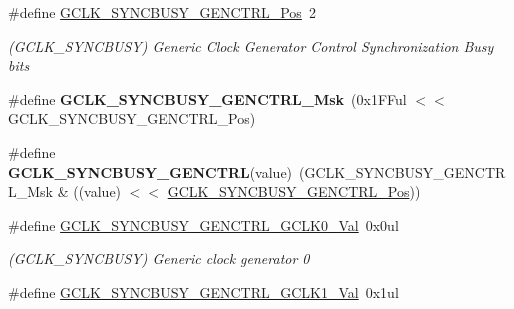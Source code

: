 \begin{DoxyCompactItemize}
\item 
\hypertarget{group___s_a_m_l21___g_c_l_k_gaccbba8857cd7d67c4c0b526841298790}{}\#define \hyperlink{group___s_a_m_l21___g_c_l_k_gaccbba8857cd7d67c4c0b526841298790}{G\+C\+L\+K\+\_\+\+S\+Y\+N\+C\+B\+U\+S\+Y\+\_\+\+G\+E\+N\+C\+T\+R\+L\+\_\+\+Pos}~2\label{group___s_a_m_l21___g_c_l_k_gaccbba8857cd7d67c4c0b526841298790}

\begin{DoxyCompactList}\small\item\em (G\+C\+L\+K\+\_\+\+S\+Y\+N\+C\+B\+U\+S\+Y) Generic Clock Generator Control Synchronization Busy bits \end{DoxyCompactList}\item 
\hypertarget{group___s_a_m_l21___g_c_l_k_ga3edcc08ad3307ebaebc71c1b793f3b9e}{}\#define {\bfseries G\+C\+L\+K\+\_\+\+S\+Y\+N\+C\+B\+U\+S\+Y\+\_\+\+G\+E\+N\+C\+T\+R\+L\+\_\+\+Msk}~(0x1\+F\+Ful $<$$<$ G\+C\+L\+K\+\_\+\+S\+Y\+N\+C\+B\+U\+S\+Y\+\_\+\+G\+E\+N\+C\+T\+R\+L\+\_\+\+Pos)\label{group___s_a_m_l21___g_c_l_k_ga3edcc08ad3307ebaebc71c1b793f3b9e}

\item 
\hypertarget{group___s_a_m_l21___g_c_l_k_ga95e77068058bd263d98538b3caf33721}{}\#define {\bfseries G\+C\+L\+K\+\_\+\+S\+Y\+N\+C\+B\+U\+S\+Y\+\_\+\+G\+E\+N\+C\+T\+R\+L}(value)~(G\+C\+L\+K\+\_\+\+S\+Y\+N\+C\+B\+U\+S\+Y\+\_\+\+G\+E\+N\+C\+T\+R\+L\+\_\+\+Msk \& ((value) $<$$<$ \hyperlink{group___s_a_m_l21___g_c_l_k_gaccbba8857cd7d67c4c0b526841298790}{G\+C\+L\+K\+\_\+\+S\+Y\+N\+C\+B\+U\+S\+Y\+\_\+\+G\+E\+N\+C\+T\+R\+L\+\_\+\+Pos}))\label{group___s_a_m_l21___g_c_l_k_ga95e77068058bd263d98538b3caf33721}

\item 
\hypertarget{group___s_a_m_l21___g_c_l_k_ga062df74b14636eb428b8f0472abb27cb}{}\#define \hyperlink{group___s_a_m_l21___g_c_l_k_ga062df74b14636eb428b8f0472abb27cb}{G\+C\+L\+K\+\_\+\+S\+Y\+N\+C\+B\+U\+S\+Y\+\_\+\+G\+E\+N\+C\+T\+R\+L\+\_\+\+G\+C\+L\+K0\+\_\+\+Val}~0x0ul\label{group___s_a_m_l21___g_c_l_k_ga062df74b14636eb428b8f0472abb27cb}

\begin{DoxyCompactList}\small\item\em (G\+C\+L\+K\+\_\+\+S\+Y\+N\+C\+B\+U\+S\+Y) Generic clock generator 0 \end{DoxyCompactList}\item 
\hypertarget{group___s_a_m_l21___g_c_l_k_ga9207e5b7583059fa7b62937d320c87a4}{}\#define \hyperlink{group___s_a_m_l21___g_c_l_k_ga9207e5b7583059fa7b62937d320c87a4}{G\+C\+L\+K\+\_\+\+S\+Y\+N\+C\+B\+U\+S\+Y\+\_\+\+G\+E\+N\+C\+T\+R\+L\+\_\+\+G\+C\+L\+K1\+\_\+\+Val}~0x1ul\label{group___s_a_m_l21___g_c_l_k_ga9207e5b7583059fa7b62937d320c87a4}


\end{DoxyCompactItemize}
